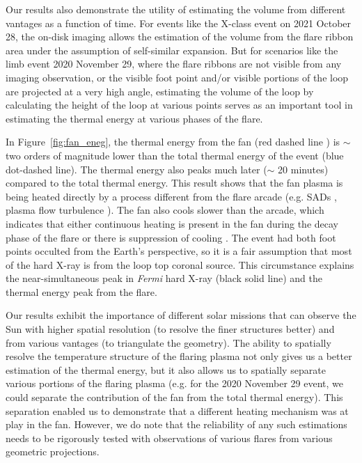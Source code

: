Our results also demonstrate the utility of estimating the volume from different vantages as a function of time. For events like the X-class event on 2021 October 28, the on-disk imaging allows the estimation of the volume from the flare ribbon area under the assumption of self-similar expansion. But for scenarios like the limb event 2020 November 29, where the flare ribbons are not visible from any imaging observation, or the visible foot point and/or visible portions of the loop are projected at a very high angle, estimating the volume of the loop by calculating the height of the loop at various points serves as an important tool in estimating the thermal energy at various phases of the flare.

In Figure~\ref{fig:fan_eneg}, the thermal energy from the fan (red dashed line ) is $\sim$ two orders of magnitude lower than the total thermal energy of the event (blue dot-dashed line). The thermal energy also peaks much later ($\sim$ 20 minutes) compared to the total thermal energy. This result shows that the fan plasma is being heated directly by a process different from the flare arcade (e.g. SADs \citep{reeves17}, plasma flow turbulence \citep{xie23}). The fan also cools slower than the arcade, which indicates that either continuous heating is present in the fan during the decay phase of the flare or there is suppression of cooling \citep[e.g.][]{xie23}. The event had both foot points occulted from the Earth's perspective, so it is a fair assumption that most of the hard X-ray is from the loop top coronal source. This circumstance explains the near-simultaneous peak in {\it Fermi} hard X-ray (black solid line) and the thermal energy peak from the flare.

Our results exhibit the importance of different solar missions that can observe the Sun with higher spatial resolution (to resolve the finer structures better) and from various vantages (to triangulate the geometry). The ability to spatially resolve the temperature structure of the flaring plasma not only gives us a better estimation of the thermal energy, but it also allows us to spatially separate various portions of the flaring plasma (e.g. for the 2020 November 29 event, we could separate the contribution of the fan from the total thermal energy). This separation enabled us to demonstrate that a different heating mechanism was at play in the fan. However, we do note that the reliability of any such estimations needs to be rigorously tested with observations of various flares from various geometric projections.


